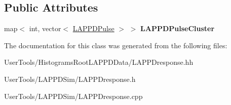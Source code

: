 \subsection*{Public Attributes}
\begin{DoxyCompactItemize}
\item 
\hypertarget{classLAPPDresponse_ae10b5dcda1903b993df6891d60b1e0d4}{
map$<$ int, vector$<$ \hyperlink{classLAPPDPulse}{LAPPDPulse} $>$ $>$ {\bfseries LAPPDPulseCluster}}
\label{classLAPPDresponse_ae10b5dcda1903b993df6891d60b1e0d4}

\end{DoxyCompactItemize}


The documentation for this class was generated from the following files:\begin{DoxyCompactItemize}
\item 
UserTools/HistogramsRootLAPPDData/LAPPDresponse.hh\item 
UserTools/LAPPDSim/LAPPDresponse.h\item 
UserTools/LAPPDSim/LAPPDresponse.cpp\end{DoxyCompactItemize}
